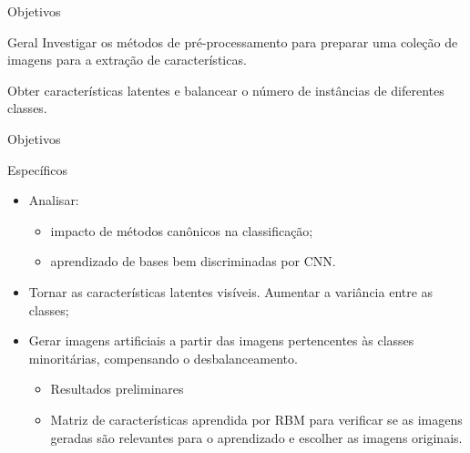 \documentclass{beamer}
\begin{document}
\begin{frame}{Objetivos}
  \begin{block}{Geral}
  \justifying
  Investigar os métodos de pré-processamento para preparar uma coleção de imagens para a extração de características.

  \vspace{5mm}
  Obter características latentes e balancear o número de instâncias de diferentes classes.
  \end{block}
\end{frame}
\begin{frame}{Objetivos}
  \begin{block}{Específicos}
    \justifying
    \begin{itemize}
      \item Analisar: 
        \begin{itemize}
          \item impacto de métodos canônicos na classificação;
          \item aprendizado de bases bem discriminadas por CNN.
        \end{itemize}
      \item Tornar as características latentes visíveis. Aumentar a variância entre as classes;%
      \item Gerar imagens artificiais a partir das imagens pertencentes às classes minoritárias, compensando o desbalanceamento. 
        \begin{itemize}
          \item Resultados preliminares 
          \item Matriz de características aprendida por RBM para verificar se as imagens geradas são relevantes para o aprendizado e escolher as imagens originais.
        \end{itemize}
    \end{itemize}
  \end{block}
\end{frame}
\end{document}
